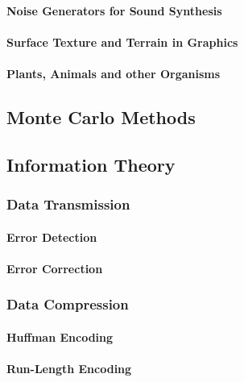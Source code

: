 \paragraph{Noise Generators for Sound Synthesis}

\paragraph{Surface Texture and Terrain in Graphics}

\paragraph{Plants, Animals and other Organisms}




\subsection{Monte Carlo Methods}


\subsection{Information Theory}


\subsubsection{Data Transmission}

\paragraph{Error Detection}

\paragraph{Error Correction}

\subsubsection{Data Compression}

\paragraph{Huffman Encoding}

\paragraph{Run-Length Encoding}






\begin{comment}

- Monte Carlo Methods

\end{comment}